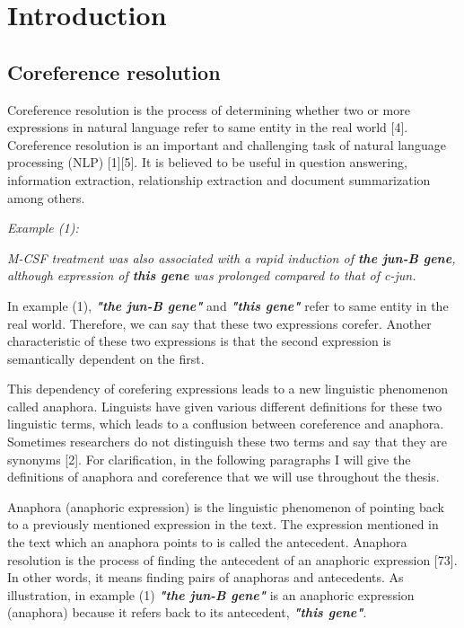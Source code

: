 \chapter{Introduction}
\label{chapter:Introduction}
\section{Coreference resolution}

Coreference resolution is the process of determining whether two or more expressions in natural language refer to same entity in the real world [4]. Coreference resolution is an important and challenging task of natural language processing (NLP) [1][5]. It is believed to be useful in question answering, information extraction, relationship extraction and document summarization among others. \vspace{5mm}
  
\emph{Example (1):}
\begin{changemargin}{10mm}{10mm} 
   \emph{ M-CSF treatment was also associated with a rapid induction of \textbf{the jun-B gene}, although expression of \textbf{this gene} was prolonged compared to that of c-jun.}          
   \vspace{5mm} 
\end{changemargin} 

In example (1), \emph{\textbf{ "the jun-B gene"}} and \emph{ \textbf{"this gene"}} refer to same entity in the real world. Therefore, we can say that these two expressions corefer. Another characteristic of these two expressions is that the second expression is semantically dependent on the first.

This dependency of corefering expressions leads to a new linguistic phenomenon called anaphora. Linguists have given various different definitions for these two linguistic terms, which leads to a conflusion between coreference and anaphora. Sometimes researchers do not distinguish these two terms and say that they are synonyms [2]. For clarification, in the following paragraphs I will give the definitions of anaphora and coreference that we will use throughout the thesis.
  
Anaphora (anaphoric expression) is the linguistic phenomenon of pointing back to a previously mentioned expression in the text. The expression mentioned in the text which an anaphora points to is called the antecedent. Anaphora resolution is the process of finding the antecedent of an anaphoric expression [73]. In other words, it means finding pairs of anaphoras and antecedents. As illustration, in example (1) \emph{\textbf{ "the jun-B gene"}} is an anaphoric expression (anaphora) because it refers back to its antecedent, \emph{ \textbf{"this gene"}}. 

